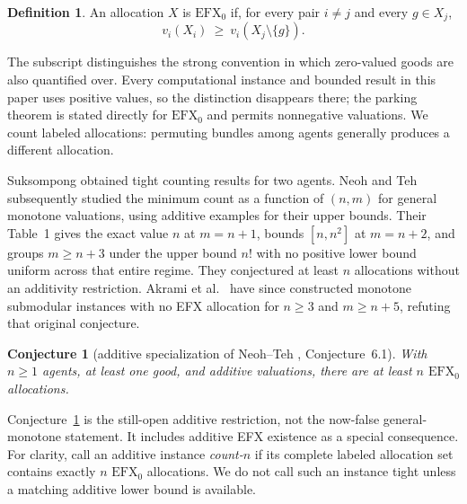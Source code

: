 \documentclass[11pt]{article}
\theoremstyle{plain}
\newtheorem{conjecture}[theorem]{Conjecture}
\theoremstyle{definition}
\newtheorem{definition}[theorem]{Definition}
\newcommand{\efxo}{\mathrm{EFX}_0}
\begin{document}
\begin{definition}\label{def:efx}
An allocation $X$ is \emph{$\efxo$} if, for every pair $i\ne j$ and every
$g\in X_j$,
\[
  v_i(X_i)\ \ge\ v_i(X_j\setminus\{g\}).
\]
\end{definition}

The subscript distinguishes the strong convention in which zero-valued goods are
also quantified over.  Every computational instance and bounded result in this
paper uses positive values, so the distinction disappears there; the parking
theorem is stated directly for $\efxo$ and permits nonnegative valuations.  We
count labeled allocations: permuting bundles among agents generally produces a
different allocation.

Suksompong \cite{Suksompong2020} obtained tight counting results for two agents.
Neoh and Teh \cite{NeohTeh2025} subsequently studied the minimum count as a
function of $(n,m)$ for general monotone valuations, using additive examples
for their upper bounds.  Their Table~1 gives the exact value $n$ at $m=n+1$,
bounds $[n,n^2]$ at $m=n+2$, and groups $m\ge n+3$ under the upper bound
$n!$ with no positive lower bound uniform across that entire regime.  They
conjectured at least $n$ allocations without an additivity restriction.
Akrami et al.\ \cite{Akrami2026SAT} have since
constructed monotone submodular instances with no EFX allocation for
$n\ge3$ and $m\ge n+5$, refuting that original conjecture.

\begin{conjecture}[additive specialization of Neoh--Teh
\cite{NeohTeh2025}, Conjecture~6.1]\label{conj:nt}
With $n\ge 1$ agents, at least one good, and additive valuations, there are
at least $n$ $\efxo$ allocations.
\end{conjecture}

Conjecture~\ref{conj:nt} is the still-open additive restriction, not the
now-false general-monotone statement.  It includes additive EFX existence as a
special consequence.  For clarity, call an additive instance \emph{count-$n$}
if its complete labeled allocation set contains exactly $n$ $\efxo$
allocations.  We do not call such an instance tight unless a matching additive
lower bound is available.
\end{document}
